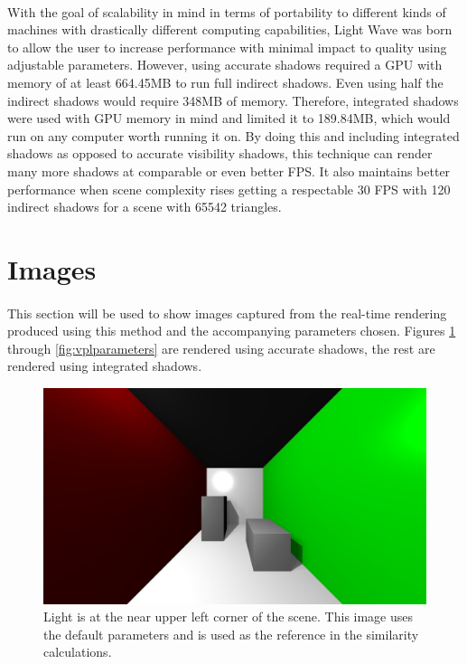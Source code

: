 \paragraph{}
With the goal of scalability in mind in terms of portability to different kinds of machines with drastically different computing capabilities, Light Wave was born to allow the user to increase performance with minimal impact to quality using adjustable parameters.  However, using accurate shadows required a GPU with memory of at least 664.45MB to run full indirect shadows. Even using half the indirect shadows would require 348MB of memory.  Therefore, integrated shadows were used with GPU memory in mind and limited it to 189.84MB, which would run on any computer worth running it on.  By doing this and including integrated shadows as opposed to accurate visibility shadows, this technique can render many more shadows at comparable or even better FPS.  It also maintains better performance when scene complexity rises getting a respectable 30 FPS with 120 indirect shadows for a scene with 65542 triangles.

\section{Images}
\paragraph{}
This section will be used to show images captured from the real-time rendering produced using this method and the accompanying parameters chosen. Figures \ref{fig:defaultimage} through \ref{fig:vplparameters} are rendered using accurate shadows, the rest are rendered using integrated shadows.

\begin{figure}[h!]
  \centering
    \includegraphics[width=1.0\textwidth]{sample1.jpg}
  \caption{Light is at the near upper left corner of the scene. This image uses the default parameters and is used as the reference in the similarity calculations.}
	\label{fig:defaultimage}
\end{figure}


